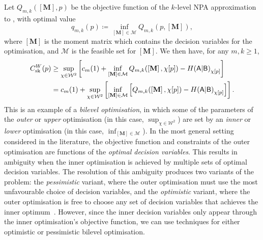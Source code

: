 \documentclass[10pt, a4paper]{article}
\numberwithin{equation}{section} %
\theoremstyle{definition}
\theoremstyle{plain}
\newcommand{\?}{\mathrel{?}} %
\newcommand{\matr}[2][]{\left[\mathbf{#2}#1\right]} %
\newcommand{\sM}{\mathcal{M}}
\newcommand{\sW}{\mathcal{W}}
\newcommand{\crv}[1]{\mathsf{#1}}
\newcommand{\sk}{\rm sk}
\begin{document}
                  Let \(Q_{m,k}(\matr{M}, p)\) be the objective function of the \(k\)-level NPA approximation to , with optimal value
                  \begin{equation}
                    q_{m,k}(p) \coloneqq \inf_{\matr{M}\in\sM} Q_{m,k}(p, \matr{M}),
                  \end{equation}
                  where \(\matr{M}\) is the moment matrix which contains the decision variables for the optimisation, and \(\sM\) is the feasible set for \(\matr{M}\). We then have, for any \(m,k\geq 1\),
                  \begin{align}
                    C^W_{\sk}(p) &\geq \sup_{\chi\in\sW^2} \left[ c_m(1) + \inf_{\matr{M}\in\sM} Q_{m,k}(\matr{M}, \chi[p]) - H{(\crv{A}|\crv{B})}_{\chi[p]} \right] \\
                                 &= c_m(1) + \sup_{\chi\in\sW^2} \left[ \inf_{\matr{M}\in\sM} \left[ Q_{m,k}(\matr{M}, \chi[p]) - H{(\crv{A}|\crv{B})}_{\chi[p]} \right] \right].
                  \end{align}
                  This is an example of a \emph{bilevel optimisation}, in which some of the parameters of the \emph{outer} or \emph{upper} optimisation (in this case, \(\sup_{\chi\in\sW^2}\)) are set by an \emph{inner} or \emph{lower} optimisation (in this case, \(\inf_{\matr{M}\in\sM}\)). In the most general setting considered in the literature, the objective function and constraints of the outer optimisation are functions of the \emph{optimal decision variables}. This results in ambiguity when the inner optimisation is achieved by multiple sets of optimal decision variables. The resolution of this ambiguity produces two variants of the problem: the \emph{pessimistic} variant, where the outer optimisation must use the most unfavourable choice of decision variables, and the \emph{optimistic} variant, where the outer optimisation is free to choose any set of decision variables that achieves the inner optimum~\cite{BilevelReview}. However, since the inner decision variables only appear through the inner optimisation's objective function, we can use techniques for either optimistic or pessimistic bilevel optimisation.
\end{document}

